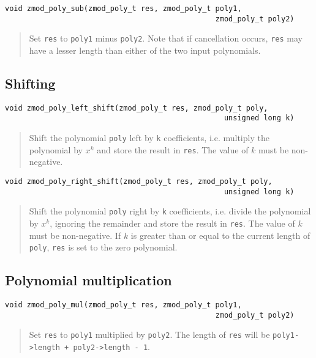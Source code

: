 \documentclass[a4paper,10pt]{article}
\newcommand{\code}{\lstinline}
\begin{document}
\begin{lstlisting}
void zmod_poly_sub(zmod_poly_t res, zmod_poly_t poly1, 
                                                zmod_poly_t poly2)
\end{lstlisting}
\begin{quote}
Set \code{res} to \code{poly1} minus \code{poly2}. Note that if cancellation occurs, \code{res} may have a lesser length than either of the two input polynomials.
\end{quote}

\subsection{Shifting}
\begin{lstlisting}
void zmod_poly_left_shift(zmod_poly_t res, zmod_poly_t poly, 
                                                  unsigned long k)
\end{lstlisting}
\begin{quote}
Shift the polynomial \code{poly} left by \code{k} coefficients, i.e. multiply the polynomial by $x^k$ and store the result in \code{res}. The value of $k$ must be non-negative.
\end{quote}

\begin{lstlisting}
void zmod_poly_right_shift(zmod_poly_t res, zmod_poly_t poly, 
                                                  unsigned long k)
\end{lstlisting}
\begin{quote}
Shift the polynomial \code{poly} right by \code{k} coefficients, i.e. divide the polynomial by $x^k$, ignoring the remainder and store the result in \code{res}. The value of $k$ must be non-negative. If $k$ is greater than or equal to the current length of \code{poly}, \code{res} is set to the zero polynomial.
\end{quote}

\subsection{Polynomial multiplication}
\begin{lstlisting}
void zmod_poly_mul(zmod_poly_t res, zmod_poly_t poly1, 
                                                zmod_poly_t poly2)
\end{lstlisting}
\begin{quote}
Set \code{res} to \code{poly1} multiplied by \code{poly2}. The length of \code{res} will be \code{poly1->length + poly2->length - 1}.
\end{quote}
\end{document}

